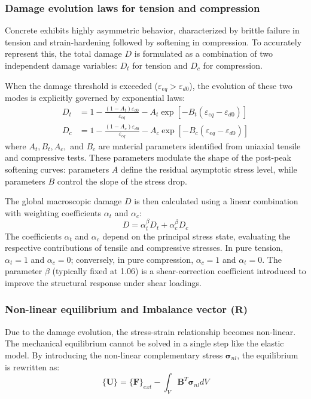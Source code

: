 \documentclass[a4paper,12pt,twoside]{report}     %
\begin{document}
\subsubsection{Damage evolution laws for tension and compression}
Concrete exhibits highly asymmetric behavior, characterized by brittle failure in tension and strain-hardening followed by softening in compression. To accurately represent this, the total damage $D$ is formulated as a combination of two independent damage variables: $D_t$ for tension and $D_c$ for compression. 

When the damage threshold is exceeded ($\varepsilon_{eq} > \varepsilon_{d0}$), the evolution of these two modes is explicitly governed by exponential laws:
\begin{align}
    D_t &= 1 - \frac{(1 - A_t) \varepsilon_{d0}}{\varepsilon_{eq}} - A_t \exp\left[ -B_t (\varepsilon_{eq} - \varepsilon_{d0}) \right] \\
    D_c &= 1 - \frac{(1 - A_c) \varepsilon_{d0}}{\varepsilon_{eq}} - A_c \exp\left[ -B_c (\varepsilon_{eq} - \varepsilon_{d0}) \right]
\end{align}
where $A_t, B_t, A_c,$ and $B_c$ are material parameters identified from uniaxial tensile and compressive tests. These parameters modulate the shape of the post-peak softening curves: parameters $A$ define the residual asymptotic stress level, while parameters $B$ control the slope of the stress drop.

The global macroscopic damage $D$ is then calculated using a linear combination with weighting coefficients $\alpha_t$ and $\alpha_c$:
\begin{equation}
    D = \alpha_t^\beta D_t + \alpha_c^\beta D_c
\end{equation}
The coefficients $\alpha_t$ and $\alpha_c$ depend on the principal stress state, evaluating the respective contributions of tensile and compressive stresses. In pure tension, $\alpha_t = 1$ and $\alpha_c = 0$; conversely, in pure compression, $\alpha_c = 1$ and $\alpha_t = 0$. The parameter $\beta$ (typically fixed at 1.06) is a shear-correction coefficient introduced to improve the structural response under shear loadings.



\subsubsection{Non-linear equilibrium and Imbalance vector ($\mathbf{R}$)}
Due to the damage evolution, the stress-strain relationship becomes non-linear. The mechanical equilibrium cannot be solved in a single step like the elastic model. By introducing the non-linear complementary stress $\boldsymbol{\sigma}_{nl}$, the equilibrium is rewritten as:
\begin{equation}
    [\mathbf{K}]\{\mathbf{U}\} = \{\mathbf{F}\}_{ext} - \int_V \mathbf{B}^T \boldsymbol{\sigma}_{nl} dV
\end{equation}
\end{document}
